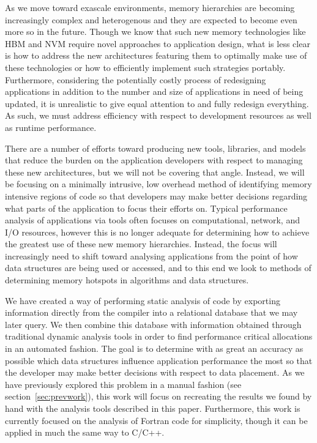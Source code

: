 As we move toward exascale environments, memory hierarchies are becoming increasingly complex and heterogenous and they are expected to become even more so in the future.
Though we know that such new memory technologies like \ac{HBM} and \ac{NVM} require novel approaches to application design, what is less clear is how to address the new architectures featuring them to optimally make use of these technologies or how to efficiently implement such strategies portably.
Furthermore, considering the potentially costly process of redesigning applications in addition to the number and size of applications in need of being updated, it is unrealistic to give equal attention to and fully redesign everything.
As such, we must address efficiency with respect to development resources as well as runtime performance.

There are a number of efforts toward producing new tools, libraries, and models that reduce the burden on the application developers with respect to managing these new architectures, but we will not be covering that angle.
Instead, we will be focusing on a minimally intrusive, low overhead method of identifying memory intensive regions of code so that developers may make better decisions regarding what parts of the application to focus their efforts on.
Typical performance analysis of applications via tools often focuses on computational, network, and I/O resources, however this is no longer adequate for determining how to achieve the greatest use of these new memory hierarchies.
Instead, the focus will increasingly need to shift toward analysing applications from the point of how data structures are being used or accessed, and to this end we look to methods of determining memory hotspots in algorithms and data structures.

We have created a way of performing static analysis of code by exporting information directly from the compiler into a relational database that we may later query.
We then combine this database with information obtained through traditional dynamic analysis tools in order to find performance critical allocations in an automated fashion.
The goal is to determine with as great an accuracy as possible which data structures influence application performance the most so that the developer may make better decisions with respect to data placement.
As we have previously explored this problem in a manual fashion (see section~\ref{sec:prevwork})\cite{Doudali:2017:CTE:3132402.3132418}, this work will focus on recreating the results we found by hand with the analysis tools described in this paper.
Furthermore, this work is currently focused on the analysis of Fortran code for simplicity, though it can be applied in much the same way to C/C++.

